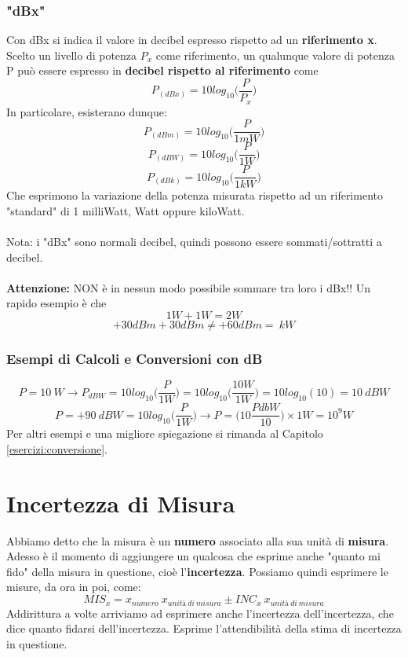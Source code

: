 \documentclass[a4paper,11pt]{report}
\begin{document}
\subsection*{"dBx"}
Con dBx si indica il valore in decibel espresso rispetto ad un \textbf{riferimento x}. Scelto un livello di potenza $P_{x}$ come riferimento, un qualunque valore di potenza P può essere espresso in \textbf{decibel rispetto al riferimento} come
$$
  P_{(dBx)} = 10log_{10}\Bigg( \frac{P}{P_{x}} \Bigg)
$$
In particolare, esisterano dunque:
$$P_{(dBm)} = 10log_{10}\Bigg( \frac{P}{1mW} \Bigg)$$
$$P_{(dBW)} = 10log_{10}\Bigg( \frac{P}{1W} \Bigg)$$
$$P_{(dBk)} = 10log_{10}\Bigg( \frac{P}{1kW} \Bigg)$$
Che esprimono la variazione della potenza misurata rispetto ad un riferimento "standard" di 1 milliWatt, Watt oppure kiloWatt.\\ \\
Nota: i "dBx" sono normali decibel, quindi possono essere sommati/sottratti a decibel.\\ \\
{\Large {\textbf{Attenzione:}}} NON è in nessun modo possibile sommare tra loro i dBx!! Un rapido esempio è che
$$1 W + 1 W = 2 W$$
$$+30 dBm + 30 dBm \neq + 60 dBm = \ kW$$
\subsection{Esempi di Calcoli e Conversioni con dB}
$$P = 10\ W \rightarrow P_{dBW} = 10 log_{10}\Bigg(\frac{P}{1W}\Bigg) = 10 log_{10}\Bigg(\frac{10 W}{1 W}\Bigg) = 10 log_{10}(10) = 10\ dBW$$
$$P = +90\ dBW = 10 log_{10}\Bigg(\frac{P}{1W}\Bigg) \rightarrow P = \Bigg( 10 \frac{PdbW}{10}\Bigg)\times 1 W = 10^9 W $$
Per altri esempi e una migliore spiegazione si rimanda al Capitolo \ref{esercizi:conversione}.
\newpage
\chapter{Incertezza di Misura}
Abbiamo detto che la misura è un \textbf{numero} associato alla sua unità di \textbf{misura}. Adesso è il momento di aggiungere un qualcosa che esprime anche "quanto mi fido" della misura in questione, cioè l'\textbf{incertezza}. Possiamo quindi esprimere le misure, da ora in poi, come: $$ MIS_{x} = x_{numero}\ x_{unità\ di\ misura} \pm INC_{x}\ x_{unità\ di\ misura} $$
Addirittura a volte arriviamo ad esprimere anche l'incertezza dell'incertezza, che dice quanto fidarsi dell'incertezza. Esprime l'attendibilità della stima di incertezza in questione.
\end{document}
